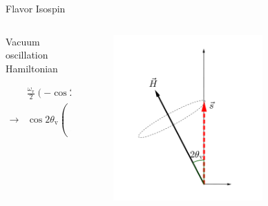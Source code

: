 \documentclass[9pt]{beamer}
\begin{document}
\begin{darkframes}
\begin{frame}{Flavor Isospin}
\begin{columns}[T]
\begin{column}{0.5\textwidth}
\end{column}
\end{columns}

\pause


\begin{columns}[T]
\begin{column}{0.5\textwidth}
\vspace{10pt}
Vacuum oscillation Hamiltonian

\begin{align*}
&\frac{\omega_{\mathrm v} }{2}\left( - \cos 2\theta_{\mathrm v } \boldsymbol{\sigma}_3  + \sin 2\theta_{\mathrm{v}} \boldsymbol{\sigma}_1\ \right)\\
\to & \cos 2\theta_{\mathrm v}\begin{pmatrix}
0\\
0\\
\omega_{\mathrm v}
\end{pmatrix} -\sin 2\theta_{\mathrm v}\begin{pmatrix}
\omega_{\mathrm v}\\
0\\
0
\end{pmatrix}
\end{align*}



\end{column}%
\begin{column}{0.5\textwidth}

\begin{figure}
    \centering
    \includegraphics[width=0.7\textwidth]{assets/flavor-isospin-1}
\end{figure}




\end{column}
\end{columns}
\end{frame}
\end{darkframes}
\end{document}
